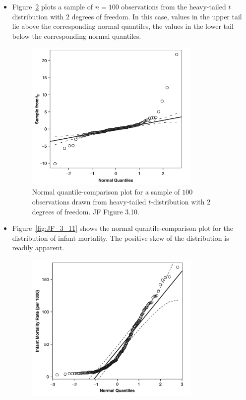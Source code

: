 \begin{itemize}
\begin{figure}[H]
\begin{center}
		\caption{
			Normal quantile-comparison plot for a sample of $100$ observations drawn from the positively skewed chi-square distribution with 2 degrees of freedom.
			JF Figure 3.9.}
		\label{fig:JF_3_9}
	\end{center}
\end{figure}
%  
  \item Figure~\ref{fig:JF_3_10} plots a sample of $n = 100$ observations from the heavy-tailed $t$ distribution with 2 degrees of freedom.
  In this case, values in the upper tail lie above the corresponding normal quantiles, the values in the lower tail below the corresponding normal quantiles.
%
\begin{figure}[H]
	\begin{center}
		\includegraphics[width=0.8\textwidth]{Lecture18/JF_3_10}
		\caption{
			Normal quantile-comparison plot for a sample of $100$ observations drawn from heavy-tailed $t$-distribution with 2 degrees of freedom.
			JF Figure 3.10.}
		\label{fig:JF_3_10}
	\end{center}
\end{figure}
%  
  \item Figure~\ref{fig:JF_3_11} shows the normal quantile-comparison plot for the distribution of infant mortality.  The positive skew of the distribution is readily apparent.
%
\begin{figure}[H]
	\begin{center}
		\includegraphics[width=0.8\textwidth]{Lecture18/JF_3_11}

\end{center}
\end{figure}
\end{itemize}
